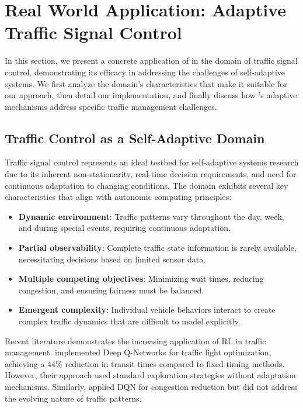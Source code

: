 
\section{Real World Application: Adaptive Traffic Signal Control}
\label{sec:application}

In this section, we present a concrete application of \adaptiverl in the domain of traffic signal control, demonstrating its efficacy in addressing the challenges of self-adaptive systems. We first analyze the domain's characteristics that make it suitable for our approach, then detail our implementation, and finally discuss how \adaptiverl's adaptive mechanisms address specific traffic management challenges.

\subsection{Traffic Control as a Self-Adaptive Domain}

Traffic signal control represents an ideal testbed for self-adaptive systems research due to its inherent non-stationarity, real-time decision requirements, and need for continuous adaptation to changing conditions. The domain exhibits several key characteristics that align with autonomic computing principles:

\begin{itemize}
    \item \textbf{Dynamic environment}: Traffic patterns vary throughout the day, week, and during special events, requiring continuous adaptation.
    \item \textbf{Partial observability}: Complete traffic state information is rarely available, necessitating decisions based on limited sensor data.
    \item \textbf{Multiple competing objectives}: Minimizing wait times, reducing congestion, and ensuring fairness must be balanced.
    \item \textbf{Emergent complexity}: Individual vehicle behaviors interact to create complex traffic dynamics that are difficult to model explicitly.
\end{itemize}

Recent literature demonstrates the increasing application of RL in traffic management. \citet{MORENOMALO2024124178} implemented Deep Q-Networks for traffic light optimization, achieving a 44\% reduction in transit times compared to fixed-timing methods. However, their approach used standard exploration strategies without adaptation mechanisms. Similarly, \citet{Swapno2024} applied DQN for congestion reduction but did not address the evolving nature of traffic patterns.

